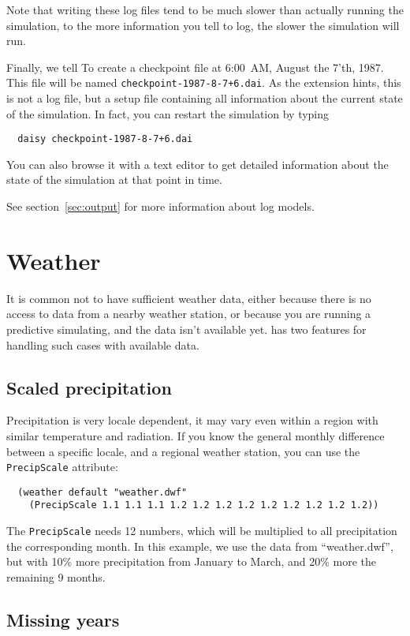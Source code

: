 \documentclass[a4paper,11pt]{article}
\begin{document}
Note that writing these log files tend to be much slower than actually
running the simulation, to the more information you tell \daisy{} to
log, the slower the simulation will run.

Finally, we tell \daisy{} To create a checkpoint file at 6:00~AM,
August the 7'th, 1987.  This file will be named
\texttt{checkpoint-1987-8-7+6.dai}.  As the extension hints, this is
not a log file, but a setup file containing all information about the
current state of the simulation.  In fact, you can restart the
simulation by typing
\begin{verbatim}
  daisy checkpoint-1987-8-7+6.dai
\end{verbatim}
You can also browse it with a text editor to get detailed information
about the state of the simulation at that point in time.

See section~\ref{sec:output} for more information about log models.


\section{Weather}
\label{sec:weather}

It is common not to have sufficient weather data, either because there
is no access to data from a nearby weather station, or because you are
running a predictive simulating, and the data isn't available yet.
\Daisy{} has two features for handling such cases with available
data.  

\subsection{Scaled precipitation}

Precipitation is very locale dependent, it may vary even within a
region with similar temperature and radiation.  If you know the
general monthly difference between a specific locale, and a regional
weather station, you can use the \texttt{PrecipScale} attribute:
\begin{verbatim}
  (weather default "weather.dwf"
    (PrecipScale 1.1 1.1 1.1 1.2 1.2 1.2 1.2 1.2 1.2 1.2 1.2 1.2))
\end{verbatim}
The \texttt{PrecipScale} needs 12 numbers, which will be multiplied to
all precipitation the corresponding month.  In this example, we use
the data from ``weather.dwf'', but with 10\% more precipitation from
January to March, and 20\% more the remaining 9 months.

\subsection{Missing years}
\end{document}
